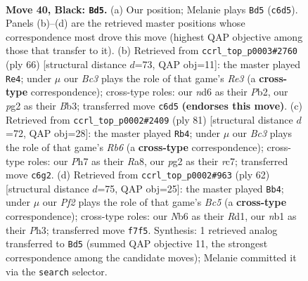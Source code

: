 \documentclass[11pt]{article}
\begin{document}
\clearpage

\begin{figure}[p]\centering
\begin{subfigure}{0.46\textwidth}\centering
\resizebox{\linewidth}{!}{%
\newchessgame
\chessboard[
  setfen={5k2/r4p1p/rnbN2p1/p3p1P1/P7/1P2P1RP/4K1P1/RN6 b - - 0 40},
  showmover=false,
  pgfstyle=straightmove, color=movearrow, markmove={c6-d5}
]}
\caption{}
\end{subfigure}\hfill
\begin{subfigure}{0.46\textwidth}\centering
\resizebox{\linewidth}{!}{%
\newchessgame
\chessboard[
  setfen={1k2r3/1p1rpp2/1n1p3p/4nPp1/1P6/1BN1R1PP/1P3P2/1K2R3 w - - 9 34},
  showmover=false,
  pgfstyle=straightmove, color=movearrow, markmove={e3-e4}
]}
\caption{}
\end{subfigure}
\\[4pt]
\begin{subfigure}{0.46\textwidth}\centering
\resizebox{\linewidth}{!}{%
\newchessgame
\chessboard[
  setfen={r6k/2R1N1pb/pn1p1p2/3P4/p3P2p/1r3B1P/1P1R2P1/6K1 b - - 1 41},
  showmover=false,
  pgfstyle=straightmove, color=movearrow, markmove={b3-b4}
]}
\caption{}
\end{subfigure}\hfill
\begin{subfigure}{0.46\textwidth}\centering
\resizebox{\linewidth}{!}{%
\newchessgame
\chessboard[
  setfen={r5k1/1p3r1p/p1p1nb2/P1Bp1p2/5P2/1P2PBPP/8/2RR2K1 w - - 3 32},
  showmover=false,
  pgfstyle=straightmove, color=movearrow, markmove={c5-b4}
]}
\caption{}
\end{subfigure}
\caption{\textbf{Move 40, Black: \texttt{Bd5}.} (a) Our position; Melanie plays \texttt{Bd5} (\texttt{c6d5}). Panels (b)--(d) are the retrieved master positions whose correspondence most drove this move (highest QAP objective among those that transfer to it). (b) Retrieved from \texttt{ccrl\_top\_p0003\#2760} (ply 66) [structural distance $d$=73, QAP obj=11]: the master played \texttt{Re4}; under $\mu$ our \emph{Bc3} plays the role of that game's \emph{Re3} (a \textbf{cross-type} correspondence); cross-type roles: our \emph{n}d6 as their \emph{P}b2, our \emph{p}g2 as their \emph{B}b3; transferred move \texttt{c6d5} \textbf{(endorses this move)}. (c) Retrieved from \texttt{ccrl\_top\_p0002\#2409} (ply 81) [structural distance $d$=72, QAP obj=28]: the master played \texttt{Rb4}; under $\mu$ our \emph{Bc3} plays the role of that game's \emph{Rb6} (a \textbf{cross-type} correspondence); cross-type roles: our \emph{P}h7 as their \emph{R}a8, our \emph{p}g2 as their \emph{r}c7; transferred move \texttt{c6g2}. (d) Retrieved from \texttt{ccrl\_top\_p0002\#963} (ply 62) [structural distance $d$=75, QAP obj=25]: the master played \texttt{Bb4}; under $\mu$ our \emph{Pf2} plays the role of that game's \emph{Bc5} (a \textbf{cross-type} correspondence); cross-type roles: our \emph{N}b6 as their \emph{R}d1, our \emph{n}b1 as their \emph{P}h3; transferred move \texttt{f7f5}. Synthesis: 1 retrieved analog transferred to \texttt{Bd5} (summed QAP objective 11, the strongest correspondence among the candidate moves); Melanie committed it via the \texttt{search} selector.}
\label{fig:thought-m79}
\end{figure}
\end{document}
